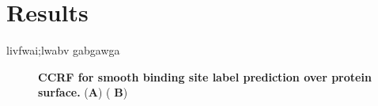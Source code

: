 \section{Results}
livfwai;lwabv
gabgawga

\begin{center}
    \begin{figure}
        \caption[CCRF for smooth binding site label prediction over protein
            surface.]{\textbf{CCRF for smooth binding site label prediction over protein surface.} ({\bf A}) ({\bf
            B}) }
  \label{fig:ccrf}
\end{figure}
\end{center}

